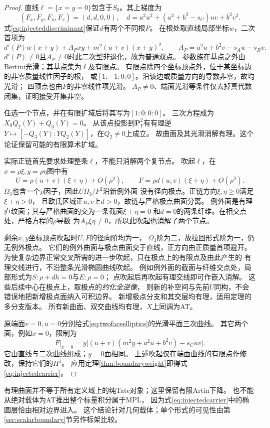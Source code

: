 \documentclass[11pt,a4paper]{ctexart}
\theoremstyle{cnplain}\newtheorem{theorem}{定理}[section]
\theoremstyle{definition}\newtheorem{definition}[theorem]{定义}
\theoremstyle{remark}\newtheorem{remark}[theorem]{注}
\begin{document}
\begin{proof}
直线$\ell=\{x=y=0\}$包含于$S_0$。其上梯度为
\[
 (F_x,F_y,F_u,F_v)=(d,d,0,0),\quad
 d=a^2u^2+(a^2+b^2-s_C)uv+b^2v^2.
\]
式\eqref{eq:injecteddiscriminant}保证$d$有两个不同根$P$。
在根处取直线局部坐标$w$，二次首项为
\[
 d'(P)w(x+y)+A_Pxy+m^2(u+v)(x+y)^2,
 \qquad A_P=a^2u+b^2v-s_Au-s_Bv.
\]
$d'(P)\ne0$且$A_P\ne0$时此二次型非退化，故为普通双点。
参数族在基点之外由Bertini光滑；其基点集为$\ell$及有限点。
有限点除四个坐标顶点外，位于某坐标边的非零质量线性因子的根，
或$[1:-1:0:0]$。沿该边或质量方向的导数非零，故均光滑；
四顶点也由$F$的非零线性项光滑。
$A_P\ne0$、端面光滑等条件仅去掉真代数闭集，证明接受开集非空。

任选一个节点，并在有限扩域后将其写为$[1:0:0:0]$。
三次方程成为$X_0Q_2(Y)+Q_3(Y)=0$。
从该点投影到$\mathbf P^2_Y$有有理逆
$Y\mapsto[-Q_3(Y):YQ_2(Y)]$，在$Q_2\ne0$上成立。
故曲面及其光滑消解有理。这个论证保留可能的有限算术扩域。

实际正链首先要求处理整条$\ell$，不能只消解两个复节点。
吹起$\ell$，在$x=\rho\xi,y=\rho\eta$图中有
\[
 U=\rho(u+v)(\xi+\eta)+O(\rho^2),\qquad
 F=\rho d(u,v)(\xi+\eta)+O(\rho^2).
\]
$\Omega_3$也含一个$\rho$因子，因此$U\Omega_3/F^2$沿新例外面
没有径向极点。正链方向$\xi,\eta\ge0$满足$\xi+\eta>0$，
且欧氏区域正$u,v$上$d>0$，故链与严格极点曲面分离。
例外面是有理直纹面；其与严格曲面的交为一条截面$\xi+\eta=0$
和$d=0$的两条纤维。在相交点处，严格方程的$\rho$导数
为$A_P\xi\eta\ne0$，所以此吹起也消解了两个节点。

剩余$x,y$坐标顶点吹起时$U,F$的径向阶均为一，
$\Omega_3$阶为二，故拉回形式阶为一，仍无例外极点。
它们的例外曲面与极点曲面交于直线，正方向由正质量首项避开。
为使复杂边界正常交叉所需的进一步吹起，只在极点上的有限点及由此产生的
有理交线进行，不沿整条光滑椭圆曲线吹起。
例如例外面的截面与纤维交点处，局部形式为$S:\rho+dh=0$与$E:\rho=0$；
点吹起后再吹起有理交线即可作嵌入消解。
这些后续中心在极点上，取极点的\emph{约化全逆像}，
则新的补空间与先前$U$同构，不会错误地把新增极点面纳入可积边界。
新增极点分支和其交层均有理，适用定理的多分支版本。
所有新曲面、双交曲线均有理，$X$上同调为AT。

原端面$v=0,u=0$分别给式\eqref{eq:twofaceelliptics}的光滑平面三次曲线。
其它两个面，例如$x=0$，限制为
\[
 F|_{x=0}=y\bigl[(u+v)(m^2y+a^2u+b^2v)-s_Cuv\bigr].
\]
它由直线与二次曲线组成；$y=0$面相同。
上述吹起仅在端面曲线的有限点作修改，保持它们的$H^1$。
应用定理\ref{thm:boundaryweight}即得式\eqref{eq:injectedcarrier}。
\end{proof}

有理曲面并不等于所有定义域上的纯Tate对象；这里保留有限Artin下降。
也不能从绝对载体为AT推出整个标量积分属于MPL，
因为式\eqref{eq:injectedcarrier}中的椭圆层恰由相对边界进入。
这个结论针对几何载体；单个形式的可见性由第\ref{sec:scalarboundary}节另作标架比较。
\end{document}
